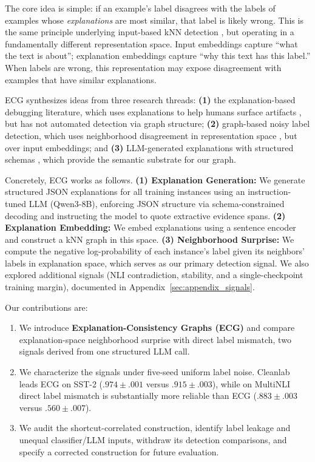 \documentclass[letterpaper]{article}
\begin{document}
The core idea is simple: if an example's label disagrees with the labels of examples whose \textit{explanations} are most similar, that label is likely wrong.
This is the same principle underlying input-based kNN detection \citep{bahri2020deep, kim2023neural}, but operating in a fundamentally different representation space.
Input embeddings capture ``what the text is about''; explanation embeddings capture ``why this text has this label.''
When labels are wrong, this representation may expose disagreement with examples that have similar explanations.

ECG synthesizes ideas from three research threads: \textbf{(1)} the explanation-based debugging literature, which uses explanations to help humans surface artifacts \citep{lertvittayakumjorn2021explanation, lertvittayakumjorn2020find, lee2023xmd}, but has not automated detection via graph structure; \textbf{(2)} graph-based noisy label detection, which uses neighborhood disagreement in representation space \citep{bahri2020deep, kim2023neural, disalvo2025wann}, but over input embeddings; and \textbf{(3)} LLM-generated explanations with structured schemas \citep{geng2023grammar, huang2023llmselfexplanations}, which provide the semantic substrate for our graph.

Concretely, ECG works as follows.
\textbf{(1) Explanation Generation:} We generate structured JSON explanations for all training instances using an instruction-tuned LLM (Qwen3-8B), enforcing JSON structure via schema-constrained decoding and instructing the model to quote extractive evidence spans.
\textbf{(2) Explanation Embedding:} We embed explanations using a sentence encoder and construct a kNN graph in this space.
\textbf{(3) Neighborhood Surprise:} We compute the negative log-probability of each instance's label given its neighbors' labels in explanation space, which serves as our primary detection signal.
We also explored additional signals (NLI contradiction, stability, and a single-checkpoint training margin), documented in Appendix~\ref{sec:appendix_signals}.

Our contributions are:
\begin{enumerate}
    \item We introduce \textbf{Explanation-Consistency Graphs (ECG)} and compare explanation-space neighborhood surprise with direct label mismatch, two signals derived from one structured LLM call.

    \item We characterize the signals under five-seed uniform label noise. Cleanlab leads ECG on SST-2 ($.974 \pm .001$ versus $.915 \pm .003$), while on MultiNLI direct label mismatch is substantially more reliable than ECG ($.883 \pm .003$ versus $.560 \pm .007$).

    \item We audit the shortcut-correlated construction, identify label leakage and unequal classifier/LLM inputs, withdraw its detection comparisons, and specify a corrected construction for future evaluation.
\end{enumerate}
\end{document}
